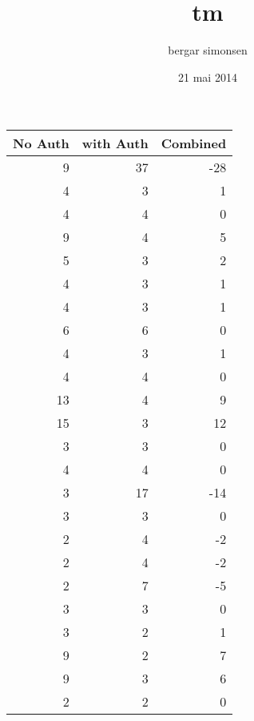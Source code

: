 \documentclass[11pt]{article}
\title{tm}
\author{bergar simonsen}
\date{21 mai 2014}
\begin{document}
\maketitle

\setcounter{tocdepth}{3}
\tableofcontents
\vspace*{1cm}

\begin{center}
\begin{tabular}{rrr}
 No Auth  &  with Auth  &  Combined  \\ \hline
       9  &         37  &       -28  \\ \hline
       4  &          3  &         1  \\ \hline
       4  &          4  &         0  \\ \hline
       9  &          4  &         5  \\ \hline
       5  &          3  &         2  \\ \hline
       4  &          3  &         1  \\ \hline
       4  &          3  &         1  \\ \hline
       6  &          6  &         0  \\ \hline
       4  &          3  &         1  \\ \hline
       4  &          4  &         0  \\ \hline
      13  &          4  &         9  \\ \hline
      15  &          3  &        12  \\ \hline
       3  &          3  &         0  \\ \hline
       4  &          4  &         0  \\ \hline
       3  &         17  &       -14  \\ \hline
       3  &          3  &         0  \\ \hline
       2  &          4  &        -2  \\ \hline
       2  &          4  &        -2  \\ \hline
       2  &          7  &        -5  \\ \hline
       3  &          3  &         0  \\ \hline
       3  &          2  &         1  \\ \hline
       9  &          2  &         7  \\ \hline
       9  &          3  &         6  \\ \hline
       2  &          2  &         0  \\ \hline

\end{tabular}
\end{center}
\end{document}
